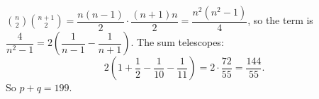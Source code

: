 $\binom n2\binom{n+1}2=\dfrac{n(n-1)}2\cdot\dfrac{(n+1)n}2=\dfrac{n^2(n^2-1)}4$, so the term is $\dfrac4{n^2-1}=2\left(\dfrac1{n-1}-\dfrac1{n+1}\right)$. The sum telescopes:
\[2\left(1+\dfrac12-\dfrac1{10}-\dfrac1{11}\right)=2\cdot\dfrac{72}{55}=\dfrac{144}{55}.\]
So $p+q=\boxed{199}$.
